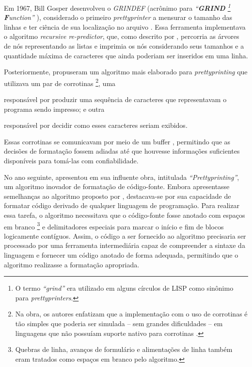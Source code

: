 \documentclass
  [11pt, a4paper, english, openright, sumario = tradicional, twoside, brazil]
  {abntex2}
\begin{document}
  Em 1967, Bill Gosper desenvolveu o \textit{GRINDEF} (acrônimo para
  \textit
    {``\textbf{GRIND}%
       \footnote
         {O termo \textit{``grind''} era utilizado em alguns círculos de LISP
          como sinônimo para \textit{prettyprinters}.}
       \textbf{F}unction''}%
  ), considerado o primeiro \textit{prettyprinter} a mensurar o tamanho das
  linhas e ter ciência de sua localização no arquivo
  \cites{gosper-2023-twubblesome}{griesemer-2022-cultural}. Essa ferramenta
  implementava o algoritmo \textit{recursive re-predictor}, que, como descrito
  por \textcite{goldstein-1973-pretty}, percorria as árvores de nós
  representando as listas e imprimia os nós considerando seus tamanhos e a
  quantidade máxima de caracteres que ainda poderiam ser inseridos em uma
  linha.

  Posteriormente, \textcite{hearn-1979-one} propuseram um algoritmo mais
  elaborado para \textit{prettyprinting} que utilizava um par de corrotinas%
  \footnote
    {Na obra, os autores enfatizam que a implementação com o uso de corrotinas
     é tão simples que poderia ser simulada -- sem grandes dificuldades -- em
     linguagens que não possuíam suporte nativo para corrotinas
     \cite[53]{hearn-1979-one}.},
  uma
  \begin{inparaenum}
    \item responsável por produzir uma sequência de caracteres que
          representavam o programa sendo impresso; e outra
    \item responsável por decidir como esses caracteres seriam exibidos.
  \end{inparaenum}
  Essas corrotinas se comunicavam por meio de um buffer ,
  permitindo que as decisões de formatação fossem adiadas até que houvesse
  informações suficientes disponíveis para tomá-las com confiabilidade.

  No ano seguinte, \textcite{oppen-1980-prettyprinting} apresentou em sua
  influente obra, intitulada \textit{``Prettyprinting''}, um algoritmo inovador
  de formatação de código-fonte. Embora apresentasse semelhanças ao algoritmo
  proposto por \textcite{hearn-1979-one}, destacava-se por sua capacidade de
  formatar código derivado de qualquer linguagem de programação. Para realizar
  essa tarefa, o algoritmo necessitava que o código-fonte fosse anotado com
  espaços em branco%
  \footnote
    {Quebras de linha, avanços de formulário e alimentações de linha também
     eram tratados como espaços em branco pelo algoritmo.}
  e delimitadores especiais para marcar o início e fim de blocos logicamente
  contíguos. Assim, o código a ser fornecido ao algoritmo precisaria ser
  processado por uma ferramenta intermediária capaz de compreender a sintaxe da
  linguagem e fornecer um código anotado de forma adequada, permitindo que o
  algoritmo realizasse a formatação apropriada.
\end{document}
